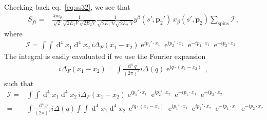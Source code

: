 Checking back eq.~\eqref{eq:ss32}, we see that 
\begin{align}
  \label{eq:ss37}
S_{fi}=&\frac{ \lambda  m_q }{\sqrt{2}}\frac{1}{\sqrt{2E_1 V}\sqrt{2E_2 V}}\frac{1 }{\sqrt{2 E_1'V}\sqrt{2 E_2'V}}  y^{\beta}(s',\mathbf{p}_2')\,x_{\beta}(s',\mathbf{p}_2)\sum_{\text{spins}} \mathcal{I}\,,
\end{align}
where
\begin{align}
  \mathcal{I}=\int\int \operatorname{d}^4x_1 \operatorname{d}^4x_2
\,i\Delta_F \left( x_1-x_2 \right)   \operatorname{e}^{i p_1'\cdot x_1}\operatorname{e}^{i p_2'\cdot x_2}
\operatorname{e}^{-i p_1\cdot x_1}\operatorname{e}^{-i p_2\cdot x_2}\,.
\end{align}
The integral is easily eavaluated if we use the Fourier expansion
\begin{align}
  i\Delta_F \left( x_1-x_2 \right)=
  \int \frac{\operatorname{d}^4q}{\left( 2\pi \right)^4} i \Delta(q)
  \operatorname{e}^{iq\cdot(x_1-x_2)}\,,
\end{align}
such that
\begin{align}
   \mathcal{I}=&\int\int \operatorname{d}^4x_1 \operatorname{d}^4x_2
\,i\Delta_F \left( x_1-x_2 \right)   \operatorname{e}^{i p_1'\cdot x_1}\operatorname{e}^{i p_2'\cdot x_2}
\operatorname{e}^{-i p_1\cdot x_1}\operatorname{e}^{-i p_2\cdot x_2} \nonumber\\
=&  \int \frac{\operatorname{d}^4q}{\left( 2\pi \right)^4} i \Delta(q)
\int\int \operatorname{d}^4x_1 \operatorname{d}^4x_2
\, \operatorname{e}^{iq\cdot(x_1-x_2)}    \operatorname{e}^{i p_1'\cdot x_1}\operatorname{e}^{i p_2'\cdot x_2}
\operatorname{e}^{-i p_1\cdot x_1}\operatorname{e}^{-i p_2\cdot x_2}   
\end{align}

